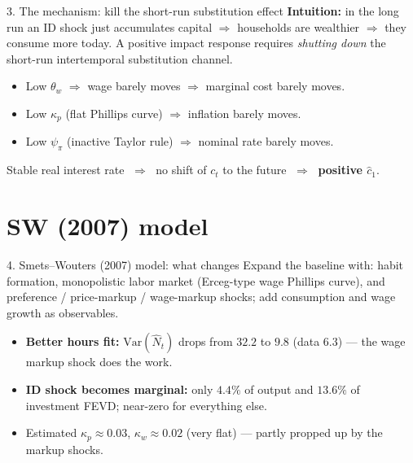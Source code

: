 \documentclass[10pt]{beamer}
\begin{document}
\begin{frame}{3. The mechanism: kill the short-run substitution effect}
	\textbf{Intuition:} in the long run an ID shock just accumulates capital $\Rightarrow$ households are wealthier $\Rightarrow$ they consume more today. A positive impact response requires \emph{shutting down} the short-run intertemporal substitution channel.
	\vspace{0.5em}
	\begin{itemize}
		\item Low $\theta_w$ $\Rightarrow$ wage barely moves $\Rightarrow$ marginal cost barely moves.
		\item Low $\kappa_p$ (flat Phillips curve) $\Rightarrow$ inflation barely moves.
		\item Low $\psi_\pi$ (inactive Taylor rule) $\Rightarrow$ nominal rate barely moves.
	\end{itemize}
	\vspace{0.5em}
	\centering
	Stable real interest rate $\;\Longrightarrow\;$ no shift of $c_t$ to the future $\;\Longrightarrow\;$ \textbf{positive $\hat c_1$}.
	\\[0.5em]
\end{frame}

\section{SW (2007) model}

\begin{frame}{4. Smets--Wouters (2007) model: what changes}
	Expand the baseline with: habit formation, monopolistic labor market (Erceg-type wage Phillips curve), and preference / price-markup / wage-markup shocks; add consumption and wage growth as observables.
	\begin{itemize}
		\item \textbf{Better hours fit:} $\mathrm{Var}(\hat N_t)$ drops from $32.2$ to $9.8$ (data $6.3$) --- the wage markup shock does the work.
		\item \textbf{ID shock becomes marginal:} only $4.4\%$ of output and $13.6\%$ of investment FEVD; near-zero for everything else.
		\item Estimated $\kappa_p\approx0.03$, $\kappa_w\approx0.02$ (very flat) --- partly propped up by the markup shocks.
	\end{itemize}
	\vspace{0.2em}
	\centering
	{\tiny}
\end{frame}
\end{document}
